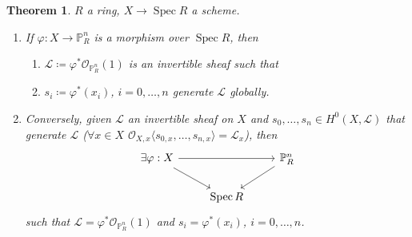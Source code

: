\documentclass[12pt]{article}
\DeclareMathOperator{\Spec}{Spec}
\newtheorem*{theorem}{Theorem}
\theoremstyle{definition}
\begin{document}
\begin{theorem}
$R$ a ring, $X\rightarrow\Spec R$ a scheme.

\begin{enumerate}[label=\arabic*)]
\item\label{morphism_invertible_sheaf} If $\varphi:X\rightarrow\mathbb{P}_R^n$ is a morphism over $\Spec R$, then
\begin{enumerate}[label=\arabic*)]
\item $\mathcal{L}\coloneqq\varphi^*\mathcal{O}_{\mathbb{P}_R^n}(1)$ is an invertible sheaf such that
\item $s_i\coloneqq\varphi^*(x_i)$, $i=0,\ldots,n$ generate $\mathcal{L}$ globally.
\end{enumerate}

\item Conversely, given $\mathcal{L}$ an invertible sheaf on $X$ and $s_0,\ldots,s_n\in H^0(X,\mathcal{L})$ that generate $\mathcal{L}$ ($\forall x\in X$ $\mathcal{O}_{X,x}\langle s_{0,x},\ldots,s_{n,x}\rangle=\mathcal{L}_x$), then
\[
\begin{tikzcd}
\exists\varphi:X\arrow[rr]\arrow[rd]&&\mathbb{P}_R^n\arrow[ld]\\
&\Spec R
\end{tikzcd}
\]
such that $\mathcal{L}=\varphi^*\mathcal{O}_{\mathbb{P}_R^n}(1)$ and $s_i=\varphi^*(x_i)$, $i=0,\ldots,n$.
\end{enumerate}
\end{theorem}
\end{document}
